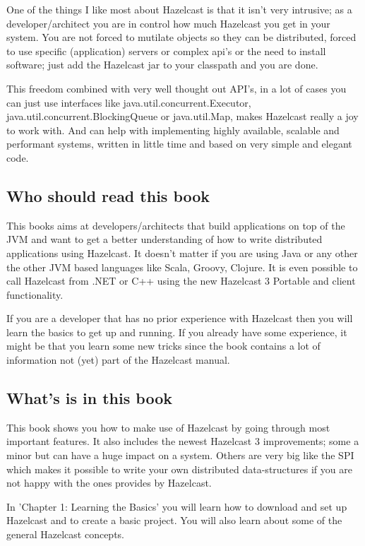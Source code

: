 One of the things I like most about Hazelcast is that it isn't very intrusive; as a developer/architect you are in control how much Hazelcast you get in your system. You are not forced to mutilate objects so they can be distributed, forced to use specific (application) servers or complex api's or the need to install software; just add the Hazelcast jar to your classpath and you are done.

This freedom combined with very well thought out API's, in a lot of cases you can just use interfaces like java.util.concurrent.Executor, java.util.concurrent.BlockingQueue or java.util.Map, makes Hazelcast really a joy to work with. And can help with implementing highly available, scalable and performant systems, written in little time and based on very simple and elegant code.

\subsection*{Who should read this book}
This books aims at developers/architects that build applications on top of the JVM and want to get a better understanding of how to write distributed applications using Hazelcast. It doesn't matter if you are using Java or any other the other JVM based languages like Scala, Groovy, Clojure. It is even possible to call Hazelcast from .NET or C++ using the new Hazelcast 3 Portable and client functionality.

If you are a developer that has no prior experience with Hazelcast then you will learn the basics to get up and running. If you already have some experience, it might be that you learn some new tricks since the book contains a lot of information not (yet) part of the Hazelcast manual.
 
\subsection*{What's is in this book}
This book shows you how to make use of Hazelcast by going through most important features. It also includes the newest Hazelcast 3 improvements; some a minor but can have a huge impact on a system. Others are very big like the SPI which makes it possible to write your own distributed data-structures if you are not happy with the ones provides by Hazelcast.

In 'Chapter 1: Learning the Basics' you will learn how to download and set up Hazelcast and to create a basic project. You will also learn about some of the general Hazelcast concepts.


